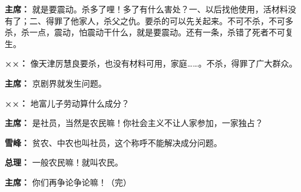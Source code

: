 \begin{list}{}
\item[\textbf{主席：}] 就是要震动。杀多了哩！多了有什么害处？一、以后找他使用，活材料没有了；二、得罪了他家人，杀父之仇。要杀的可以先关起来。不可不杀，不可多杀，杀一点，震动，怕震动干什么，就是要震动。还有一条，杀错了死者不可复生。

\item[\textbf{××：}] 像天津厉慧良要杀，也没有材料可用，家庭……。不杀，得罪了广大群众。

\item[\textbf{主席：}] 京剧界就发生问题。

\item[\textbf{××：}] 地富儿子劳动算什么成分？

\item[\textbf{主席：}] 是社员，当然是农民嘛！你社会主义不让人家参加，一家独占？

\item[\textbf{雪峰：}] 贫农、中农也叫社员，这个称呼不能解决成分问题。

\item[\textbf{总理：}] 一般农民嘛！就叫农民。

\item[\textbf{主席：}] 你们再争论争论嘛！（完）
\end{list}

